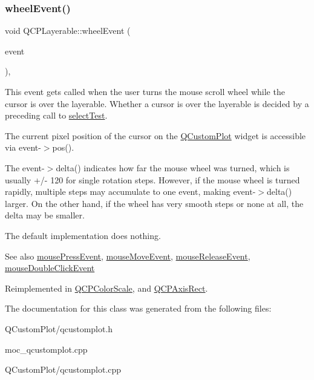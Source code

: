 \subsubsection{\texorpdfstring{wheel\+Event()}{wheelEvent()}}
{\footnotesize\ttfamily void Q\+C\+P\+Layerable\+::wheel\+Event (\begin{DoxyParamCaption}\item[{Q\+Wheel\+Event $\ast$}]{event }\end{DoxyParamCaption})\hspace{0.3cm}{\ttfamily [protected]}, {\ttfamily [virtual]}}

This event gets called when the user turns the mouse scroll wheel while the cursor is over the layerable. Whether a cursor is over the layerable is decided by a preceding call to \mbox{\hyperlink{class_q_c_p_layerable_a04db8351fefd44cfdb77958e75c6288e}{select\+Test}}.

The current pixel position of the cursor on the \mbox{\hyperlink{class_q_custom_plot}{Q\+Custom\+Plot}} widget is accessible via {\ttfamily event-\/$>$pos()}.

The {\ttfamily event-\/$>$delta()} indicates how far the mouse wheel was turned, which is usually +/-\/ 120 for single rotation steps. However, if the mouse wheel is turned rapidly, multiple steps may accumulate to one event, making {\ttfamily event-\/$>$delta()} larger. On the other hand, if the wheel has very smooth steps or none at all, the delta may be smaller.

The default implementation does nothing.

\begin{DoxySeeAlso}{See also}
\mbox{\hyperlink{class_q_c_p_layerable_af6567604818db90f4fd52822f8bc8376}{mouse\+Press\+Event}}, \mbox{\hyperlink{class_q_c_p_layerable_a9eee1ba47fd69be111059ca3881933e4}{mouse\+Move\+Event}}, \mbox{\hyperlink{class_q_c_p_layerable_aa0d79b005686f668622bbe66ac03ba2c}{mouse\+Release\+Event}}, \mbox{\hyperlink{class_q_c_p_layerable_a4171e2e823aca242dd0279f00ed2de81}{mouse\+Double\+Click\+Event}} 
\end{DoxySeeAlso}


Reimplemented in \mbox{\hyperlink{class_q_c_p_color_scale_a63cf19be184f6670c9495ad3a9a1baeb}{Q\+C\+P\+Color\+Scale}}, and \mbox{\hyperlink{class_q_c_p_axis_rect_a93eeaa0c127d6d6fe8171b2455080262}{Q\+C\+P\+Axis\+Rect}}.



The documentation for this class was generated from the following files\+:\begin{DoxyCompactItemize}
\item 
Q\+Custom\+Plot/qcustomplot.\+h\item 
moc\+\_\+qcustomplot.\+cpp\item 
Q\+Custom\+Plot/qcustomplot.\+cpp\end{DoxyCompactItemize}
